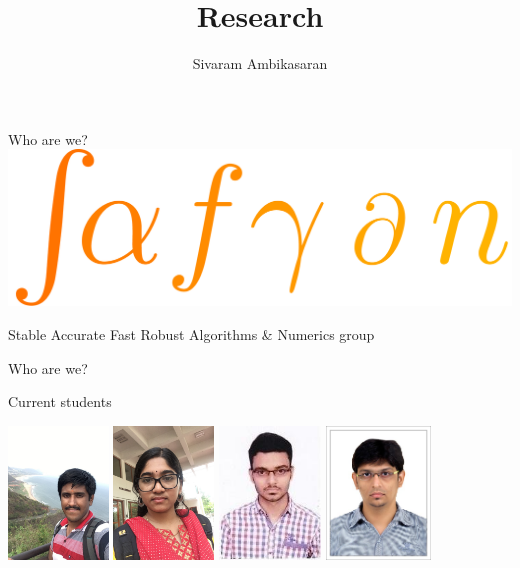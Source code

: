 \documentclass{beamer}
\title[Research]{Research}
\author[Sivaram Ambikasaran]{Sivaram Ambikasaran}
\institute[IITM]{Indian Institute of Technology Madras}
\begin{document}
\frame{\titlepage}

\begin{frame}{Who are we?}
	\includegraphics[width=\textwidth]{./images/SAFRAN_Logo.png}
	\begin{center}
	Stable Accurate Fast Robust Algorithms \& Numerics group
	\end{center}
\end{frame}

\begin{frame}{Who are we?}
	\begin{center}
	\huge{Current students}
	\end{center}
	\includegraphics[width=0.2\textwidth]{./images/Kandappan.jpg} \hspace{1em}
	\includegraphics[width=0.2\textwidth]{./images/Vaishnavi.jpeg} \hspace{1em}
	\includegraphics[width=0.2025\textwidth]{./images/Ritesh.jpg} \hspace{1em}
	\includegraphics[width=0.21\textwidth]{./images/Pragnesh.jpg}
\end{frame}
\end{document}

